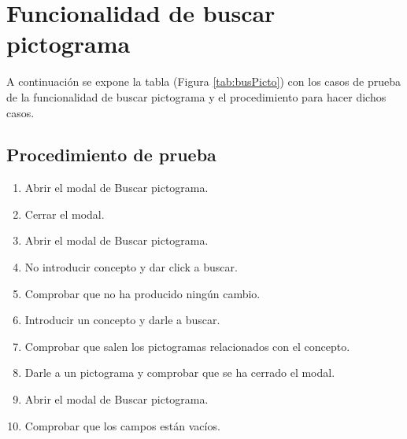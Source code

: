 \section{Funcionalidad de buscar pictograma}
\label{planPruebas:busPicto}
A continuación se expone la tabla (Figura \ref{tab:busPicto}) con los casos de prueba de la funcionalidad de buscar pictograma y el procedimiento para hacer dichos casos.

\begin{table}[H]
    \centering
    \caption{Casos de prueba de la funcionalidad de buscar pictograma.}
    \label{tab:busPicto}
\end{table}

\subsection{Procedimiento de prueba}
\label{procedimientoPruebas:busPicto}
\begin{enumerate}
    \item Abrir el modal de Buscar pictograma.
    \item Cerrar el modal.
    \item Abrir el modal de Buscar pictograma.
    \item No introducir concepto y dar click a buscar.
    \item Comprobar que no ha producido ningún cambio.
    \item Introducir un concepto y darle a buscar.
    \item Comprobar que salen los pictogramas relacionados con el concepto.
    \item Darle a un pictograma y comprobar que se ha cerrado el modal.
    \item Abrir el modal de Buscar pictograma.
    \item Comprobar que los campos están vacíos.

\end{enumerate}


